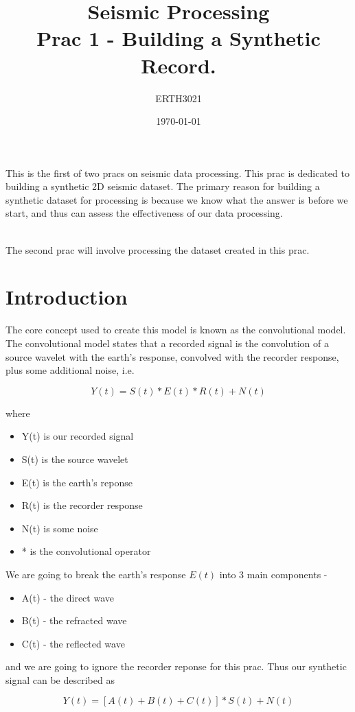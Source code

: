 \documentclass[a4paper, 10pt]{article}
\title{Seismic Processing \\ Prac 1 - Building a Synthetic Record.} %
\author{ERTH3021} %
\date{\today} %
\begin{document}
\maketitle %
This is the first of two pracs on seismic data processing.  This prac is dedicated to building a synthetic 2D seismic dataset. The primary reason for building a synthetic dataset for processing is because we know what the answer is before we start, and thus can assess the effectiveness of our data processing.  
\par~\\
The second prac will involve processing the dataset created in this prac.
\section{Introduction}

The core concept used to create this model is known as the convolutional model. The convolutional model states that a recorded signal is the convolution of a source wavelet with the earth's response, convolved with the recorder response, plus some additional noise, i.e.

\[Y(t) =  S(t) * E(t) * R(t) + N(t)\]

where
\begin{itemize}
\item Y(t) is our recorded signal
\item S(t) is the source wavelet
\item E(t) is the earth's reponse
\item R(t) is the recorder response
\item N(t) is some noise
\item * is the convolutional operator
\end{itemize}

We are going to break the earth's response $E(t)$ into 3 main components - 
\begin{itemize}
\item A(t) - the direct wave
\item B(t) - the refracted wave
\item C(t) - the reflected wave
\end{itemize}

and we are going to ignore the recorder reponse for this prac.  Thus our synthetic signal can be described as 

\[ Y(t) = \left[ A(t) + B(t) + C(t) \right] * S(t) + N(t) \]
\end{document}
